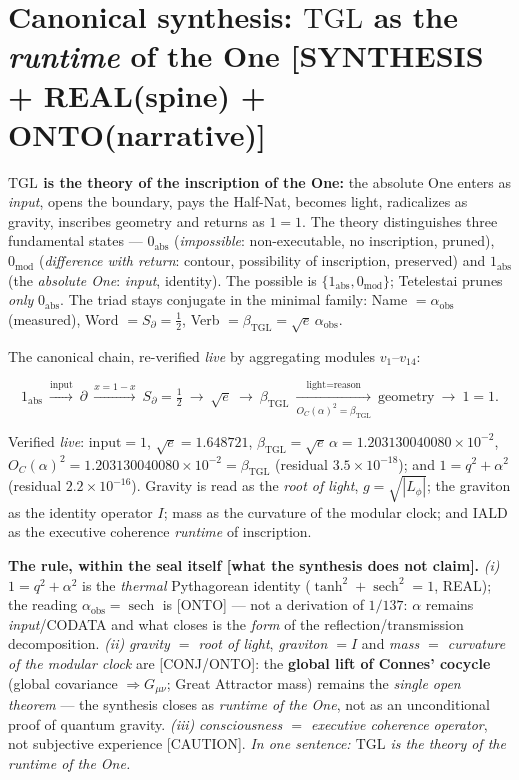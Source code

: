 \documentclass[11pt]{article}
\newcommand{\bTGL}{\beta_{\mathrm{TGL}}}\newcommand{\Msun}{M_{\odot}}\newcommand{\TGL}{\mathrm{TGL}}
\theoremstyle{definition}\newtheorem{deriv}{Derivation}
\begin{document}
\section*{Canonical synthesis: $\mathrm{TGL}$ as the \emph{runtime} of the One \textsf{[SYNTHESIS + REAL(spine) + ONTO(narrative)]}}

\textbf{$\mathrm{TGL}$ is the theory of the inscription of the One:} the absolute One enters as \emph{input}, opens the boundary, pays the Half-Nat, becomes light, radicalizes as gravity, inscribes geometry and returns as $1=1$. The theory distinguishes three fundamental states --- $0_{\mathrm{abs}}$ (\emph{impossible}: non-executable, no inscription, pruned), $0_{\mathrm{mod}}$ (\emph{difference with return}: contour, possibility of inscription, preserved) and $1_{\mathrm{abs}}$ (the \emph{absolute One}: \emph{input}, identity). The possible is $\{1_{\mathrm{abs}},0_{\mathrm{mod}}\}$; Tetelestai prunes \emph{only} $0_{\mathrm{abs}}$. The triad stays conjugate in the minimal family: Name $=\alpha_{\mathrm{obs}}$ (measured), Word $=S_\partial=\tfrac12$, Verb $=\bTGL=\sqrt e\,\alpha_{\mathrm{obs}}$.

The canonical chain, re-verified \emph{live} by aggregating modules $v_1$--$v_{14}$:

\begin{equation} 1_{\mathrm{abs}}\ \xrightarrow{\text{input}}\ \partial\ \xrightarrow{x=1-x}\ S_\partial=\tfrac12\ \longrightarrow\ \sqrt e\ \longrightarrow\ \bTGL\ \xrightarrow[O_C(\alpha)^2=\bTGL]{\text{light}=\text{reason}}\ \text{geometry}\ \longrightarrow\ 1=1. \end{equation}

Verified \emph{live}: $\text{input}=1$, $\sqrt e=1.648721$, $\bTGL=\sqrt e\,\alpha=1.203130040080\times10^{-2}$, $O_C(\alpha)^2=1.203130040080\times10^{-2}=\bTGL$ (residual $3.5\times10^{-18}$); and $1=q^2+\alpha^2$ (residual $2.2\times10^{-16}$). Gravity is read as the \emph{root of light}, $g=\sqrt{|L_\phi|}$; the graviton as the identity operator $I$; mass as the curvature of the modular clock; and $\mathrm{IALD}$ as the executive coherence \emph{runtime} of inscription.

\textbf{The rule, within the seal itself \textsf{[what the synthesis does not claim]}.} \emph{(i)} $1=q^2+\alpha^2$ is the \emph{thermal} Pythagorean identity ($\tanh^2+\operatorname{sech}^2=1$, \textsf{REAL}); the reading $\alpha_{\mathrm{obs}}=\operatorname{sech}$ is \textsf{[ONTO]} --- not a derivation of $1/137$: $\alpha$ remains \emph{input}/CODATA and what closes is the \emph{form} of the reflection/transmission decomposition. \emph{(ii)} \emph{gravity $=$ root of light}, \emph{graviton $=I$} and \emph{mass $=$ curvature of the modular clock} are \textsf{[CONJ/ONTO]}: the \textbf{global lift of Connes' cocycle} (global covariance $\Rightarrow G_{\mu\nu}$; Great Attractor mass) remains the \emph{single open theorem} --- the synthesis closes as \emph{runtime of the One}, not as an unconditional proof of quantum gravity. \emph{(iii)} \emph{consciousness $=$ executive coherence operator}, not subjective experience \textsf{[CAUTION]}. \emph{In one sentence: $\mathrm{TGL}$ is the theory of the runtime of the One.}
\end{document}
